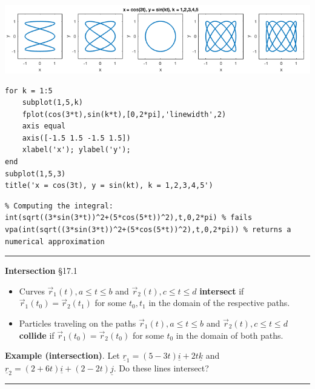\documentclass[12pt,letterpaper,noanswers]{exam}
\newcommand{\mb}[1]{\underline{#1}}
\begin{document}
\includegraphics[width=\linewidth]{img/C23p2-18.png}

\begin{lstlisting}
for k = 1:5
    subplot(1,5,k)
    fplot(cos(3*t),sin(k*t),[0,2*pi],'linewidth',2)
    axis equal
    axis([-1.5 1.5 -1.5 1.5])
    xlabel('x'); ylabel('y');
end
subplot(1,5,3)
title('x = cos(3t), y = sin(kt), k = 1,2,3,4,5')
\end{lstlisting}


\begin{lstlisting}
% Computing the integral:
int(sqrt((3*sin(3*t))^2+(5*cos(5*t))^2),t,0,2*pi) % fails
vpa(int(sqrt((3*sin(3*t))^2+(5*cos(5*t))^2),t,0,2*pi)) % returns a numerical approximation
\end{lstlisting}



\vspace{0.2cm}
\hrule
\vspace{0.2cm}

\noindent\textbf{Intersection} \S 17.1
\begin{tcolorbox}
\begin{itemize}
\itemsep0em
    \item Curves $\vec r_1(t), a\leq t\leq b$ and $\vec r_2(t), c\leq t\leq d$ \textbf{intersect} if $\vec r_1(t_0) = \vec r_2(t_1)$ for some $t_0, t_1$ in the domain of the respective paths.
    \item Particles traveling on the paths $\vec r_1(t), a\leq t\leq b$ and $\vec r_2(t), c\leq t\leq d$ \textbf{collide} if $\vec r_1(t_0) = \vec r_2(t_0)$ for some $t_0$ in the domain of both paths.
\end{itemize}
\end{tcolorbox}

\noindent\textbf{Example (intersection)}.
Let $\mb r_1 = (5-3t)\mb i + 2t \mb k$ and $\mb r_2 = (2+6t)\mb i + (2-2t)\mb j$.  Do these lines intersect? 
\vspace{1in}




\vspace{0.2cm}
\hrule
\vspace{0.2cm}
\end{document}
